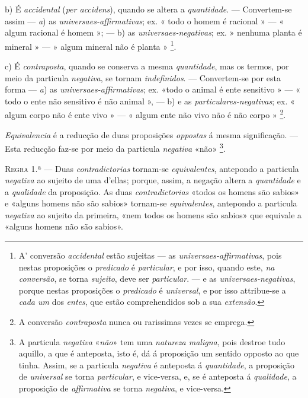 b) É \emph{accidental} (\emph{per accidens}), quando se altera a \emph{quantidade}. --- Convertem-se assim --- \emph{a}) as \emph{universaes-affirmativas}; ex. « todo o homem é racional » --- « algum racional é homem »; --- b) as \emph{universaes-negativas}; ex. » nenhuma planta é mineral » --- » algum mineral não é planta » \footnote{A' conversão \emph{accidental} estão sujeitas --- as \emph{universaes-affirmativas}, pois nestas proposições o \emph{predicado} é \emph{particular}, e por isso, quando este, \emph{na conversão}, se torna \emph{sujeito}, deve ser \emph{particular}. --- e as \emph{universaes-negativas}, porque nestas proposições o \emph{predicado} é \emph{universal}, e por isso attribue-se a \emph{cada um} dos \emph{entes}, que estão comprehendidos sob a sua \emph{extensão}.}.

c) É \emph{contraposta}, quando se conserva a mesma \emph{quantidade}, mas os termos, por meio da particula \emph{negativa}, se tornam \emph{indefinidos}. --- Convertem-se por esta forma --- \emph{a}) as \emph{universaes-affirmativas}; ex. «todo o animal é ente sensitivo » --- « todo o ente não sensitivo é não animal », --- b) e as \emph{particulares-negativas}; ex. « algum corpo não é ente vivo » --- « algum ente não vivo não é não corpo » \footnote{A conversão \emph{contraposta} nunca ou rarissimas vezes se emprega.}.


\emph{Equivalencia} é a reducção de duas proposições \emph{oppostas} á mesma significação. --- Esta reducção faz-se por meio da particula \emph{negativa} «não» \footnote{A particula \emph{negativa} «\emph{não}» tem uma \emph{natureza maligna}, pois destroe tudo aquillo, a que é anteposta, isto é, dá á proposição um sentido opposto ao que tinha. Assim, se a particula \emph{negativa} é anteposta á \emph{quantidade}, a proposição de \emph{universal} se torna \emph{particular}, e vice-versa, e, se é anteposta á \emph{qualidade}, a proposição de \emph{affirmativa} se torna \emph{negativa}, e vice-versa.}.


 

\textsc{Regra} 1.ª --- Duas \emph{contradictorias} tornam-se \emph{equivalentes}, antepondo a particula \emph{negativa} ao sujeito de uma d'ellas; porque, assim, a negação altera a \emph{quantidade} e a \emph{qualidade} da proposição. As duas \emph{contradictorias} «todos os homens são sabios» e «alguns homens não são sabios» tornam-se \emph{equivalentes}, antepondo a particula \emph{negativa} ao sujeito da primeira, «nem todos os homens são sabios» que equivale a «alguns homens não são sabios».

